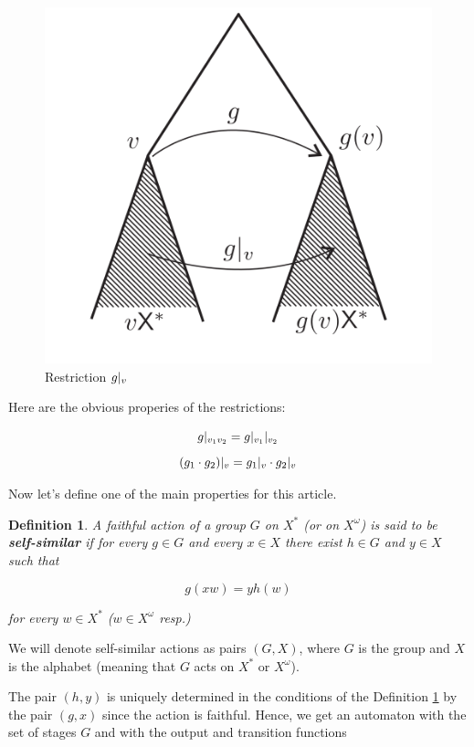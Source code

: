 \documentclass[a4paper,12pt]{amsart}
\newtheorem{definition}{Definition}
\begin{document}
	\begin{figure}[h]
	 	\includegraphics[scale=0.8]{restriction.png}
	 	\caption{Restriction $g\arrowvert_v$}
	 \end{figure}
	 
	 Here are the obvious properies of the restrictions: 
	 
	 $$g\arrowvert_{v_1v_2} = g\arrowvert_{v_1}\arrowvert_{v_2}$$
	 $$(g_1 \cdot g_2)\arrowvert_v = g_1\arrowvert_v \cdot g_2\arrowvert_v$$
	 
	 Now let's define one of the main properties for this article. 
	 
	\begin{definition}\label{def:self_similar_action}
		A faithful action of a group $G$ on $X^*$ (or on $X^\omega$) is said to be \textbf{self-similar} if for every $g \in G$ and every $x \in X$ there exist $h \in G$ and $y \in X$ such that 
		
		$$g(xw) = yh(w)$$
		
		for every $w \in X^*$ ($w \in X^\omega$ resp.)
	\end{definition}

	We will denote 	self-similar actions as pairs $(G, X)$, where $G$ is the group and $X$ is the alphabet (meaning that $G$ acts on $X^*$ or $X^\omega$).
	
	The pair $(h, y)$ is uniquely determined in the conditions of the Definition \ref{def:self_similar_action} by the pair $(g, x)$ since the action is faithful. Hence, we get an automaton with the set of stages $G$ and with the output and transition functions
	
\end{document}
